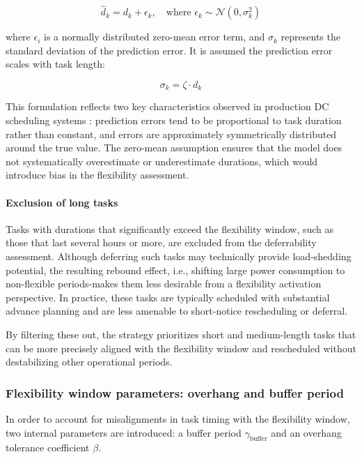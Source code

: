 \documentclass[preprint,12pt]{elsarticle}
\begin{document}
\begin{equation}
    \hat{d}_k = d_k + \epsilon_k, \quad \text{where } \epsilon_k \sim \mathcal{N}(0, \sigma_k^2)
\end{equation}

where $\epsilon_i$ is a normally distributed zero-mean error term, and $\sigma_k$ represents the standard deviation of the prediction error. It is assumed the prediction error scales with task length:

\begin{equation}
    \sigma_k = \zeta \cdot d_k
\end{equation}

This formulation reflects two key characteristics observed in production DC scheduling systems \cite{Hu2021, Yeung2022}: prediction errors tend to be proportional to task duration rather than constant, and errors are approximately symmetrically distributed around the true value. The zero-mean assumption ensures that the model does not systematically overestimate or underestimate durations, which would introduce bias in the flexibility assessment. 

\paragraph{Exclusion of long tasks}
Tasks with durations that significantly exceed the flexibility window, such as those that last several hours or more, are excluded from the deferrability assessment. Although deferring such tasks may technically provide load-shedding potential, the resulting rebound effect, i.e., shifting large power consumption to non-flexible periods-makes them less desirable from a flexibility activation perspective. In practice, these tasks are typically scheduled with substantial advance planning and are less amenable to short-notice rescheduling or deferral.

By filtering these out, the strategy prioritizes short and medium-length tasks that can be more precisely aligned with the flexibility window and rescheduled without destabilizing other operational periods.


\subsubsection{Flexibility window parameters: overhang and buffer period}


In order to account for misalignments in task timing with the flexibility window, two internal parameters are introduced: a buffer period $\gamma_{\text{buffer}}$ and an overhang tolerance coefficient $\beta$.
\end{document}
